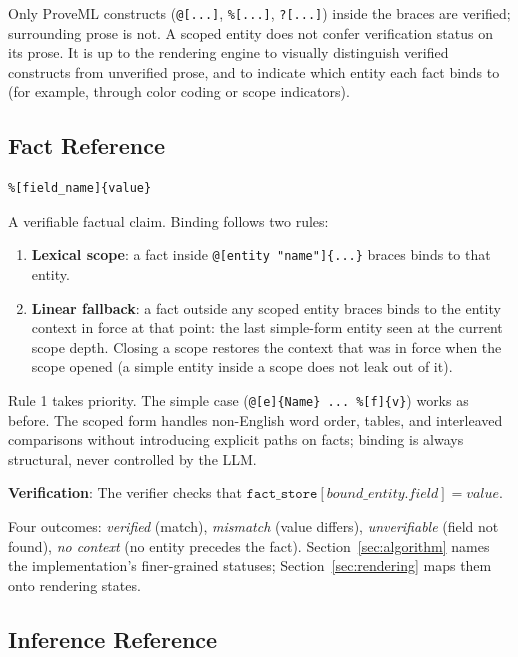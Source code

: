 \documentclass[11pt,a4paper]{article}
\begin{document}
\noindent Only ProveML constructs (\texttt{@[...]}, \texttt{\%[...]}, \texttt{?[...]}) inside the braces are verified; surrounding prose is not. A scoped entity does not confer verification status on its prose. It is up to the rendering engine to visually distinguish verified constructs from unverified prose, and to indicate which entity each fact binds to (for example, through color coding or scope indicators).

\subsection{Fact Reference}

\begin{lstlisting}
%[field_name]{value}
\end{lstlisting}

A verifiable factual claim. Binding follows two rules:

\begin{enumerate}
    \item \textbf{Lexical scope}: a fact inside \texttt{@[entity "name"]\{...\}} braces binds to that entity.
    \item \textbf{Linear fallback}: a fact outside any scoped entity braces binds to the entity context in force at that point: the last simple-form entity seen at the current scope depth. Closing a scope restores the context that was in force when the scope opened (a simple entity inside a scope does not leak out of it).
\end{enumerate}

\noindent Rule 1 takes priority. The simple case (\texttt{@[e]\{Name\} ... \%[f]\{v\}}) works as before. The scoped form handles non-English word order, tables, and interleaved comparisons without introducing explicit paths on facts; binding is always structural, never controlled by the LLM.

\textbf{Verification}: The verifier checks that $\texttt{fact\_store}[\textit{bound\_entity}\texttt{.}\textit{field}] = \textit{value}$.

Four outcomes: \textit{verified} (match), \textit{mismatch} (value differs), \textit{unverifiable} (field not found), \textit{no context} (no entity precedes the fact). Section~\ref{sec:algorithm} names the implementation's finer-grained statuses; Section~\ref{sec:rendering} maps them onto rendering states.

\subsection{Inference Reference}
\end{document}
